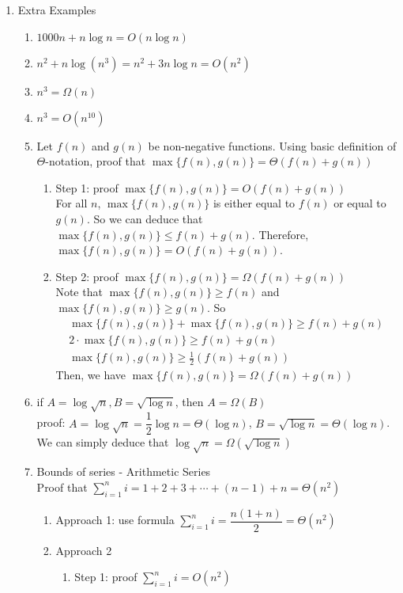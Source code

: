 \documentclass[11pt]{article}
\begin{document}
\begin{enumerate}
\item Extra Examples
\begin{enumerate}
\item $1000n + n \log n = O(n \log n)$
\item $n^2 + n \log (n^3) = n^2 + 3n \log n = O(n^2)$
\item $n ^3 = \Omega (n)$
\item $n^3 = O(n ^{10})$
\item Let $f(n)$ and $g(n)$ be non-negative functions. Using basic definition of $\Theta$-notation, proof that $\max\{f(n), g(n)\} = \Theta(f(n) + g(n))$
\begin{enumerate}
\item Step 1: proof $\max \{ f(n), g(n)\} = O(f(n) + g(n))$\\
For all $n$, $\max \{ f(n), g(n)\}$ is either equal to $f(n)$ or equal to $g(n)$. So we can deduce that $\max \{ f(n), g(n)\} \leq f(n) + g(n)$. Therefore, $\max \{ f(n), g(n)\} = O(f(n) + g(n))$.
\item Step 2: proof $\max \{ f(n), g(n)\} = \Omega(f(n) + g(n))$\\
Note that $\max \{ f(n), g(n)\} \geq f(n)$ and $\max \{ f(n), g(n)\} \geq g(n)$. So 
\begin{align*}
\max \{ f(n), g(n)\} + \max \{ f(n), g(n)\} \geq f(n) + g(n) \\
2\cdot \max \{ f(n), g(n)\} \geq f(n) + g(n)\\
\max \{ f(n), g(n)\} \geq \frac{1}{2} (f(n) + g(n))
\end{align*}
Then, we have $\max \{ f(n), g(n)\} = \Omega (f(n) + g(n))$
\end{enumerate}
\item if $A = \log \sqrt{n}, B = \sqrt{\log n}$, then $A = \Omega(B)$\\
proof: $A = \log \sqrt{n} = \dfrac{1}{2} \log n = \Theta(\log n)$, $B = \sqrt{\log n} = \Theta(\log n)$. We can simply deduce that $\log \sqrt{n} = \Omega(\sqrt{\log n})$
\item Bounds of series - Arithmetic Series\\
Proof that $\sum_{i=1}^{n} i = 1 +2 +3 + \cdots + (n-1) + n = \Theta (n^2)$
\begin{enumerate}
\item Approach 1: use formula $\sum_{i=1}^{n} i = \dfrac{n(1+n)}{2} = \Theta (n^2)$
\item Approach 2
\begin{enumerate}
\item Step 1: proof $\sum_{i=1}^{n} i = O(n^2)$\\

\end{enumerate}
\end{enumerate}
\end{enumerate}
\end{enumerate}
\end{document}
